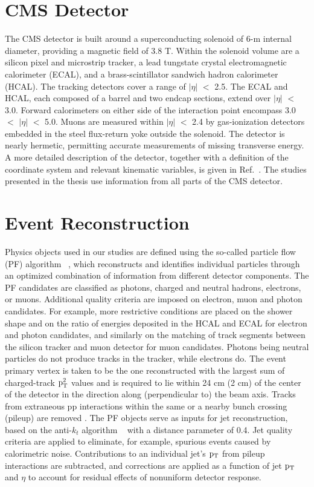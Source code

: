 \section{CMS Detector }
The CMS detector is built around a superconducting solenoid of 6-m internal diameter, providing
a magnetic field of 3.8 T. Within the solenoid volume are a silicon pixel and microstrip tracker, a
lead tungstate crystal electromagnetic calorimeter (ECAL), and a brass-scintillator sandwich hadron
calorimeter (HCAL). The tracking detectors cover a range of  $|\eta|$ $<$  2.5. The ECAL and HCAL, each composed of a barrel and two endcap sections, extend over  $|\eta|$ $<$ 3.0. Forward calorimeters on either side of the
interaction point encompass 3.0 $<$  $|\eta|$ $<$ 5.0. Muons
are measured within $|\eta|$ $<$ 2.4 by gas-ionization detectors embedded in the steel flux-return
yoke outside the solenoid. The detector is nearly hermetic, permitting accurate measurements
of missing transverse energy. A more detailed description of the detector, together with a definition of the
coordinate system and relevant kinematic variables, is given in Ref.~\cite{cms}. The studies presented in the thesis use information from all parts of the CMS detector.

\section{Event Reconstruction }
Physics objects used in our studies are defined using the so-called particle flow (PF) algorithm ~\cite{Beaudette:2014cea}, which reconstructs
and identifies individual particles through an optimized combination of information from different
detector components. The PF candidates are classified as photons, charged and
neutral hadrons, electrons, or muons. Additional quality criteria are imposed on electron,
muon and photon candidates. For example, more restrictive conditions are placed on the
shower shape and on the ratio of energies deposited in the HCAL and ECAL for electron and photon candidates,
and similarly on the matching of track segments between the silicon tracker and muon detector
for muon candidates. Photons being neutral particles do not produce tracks in the tracker, while electrons do. The event primary vertex is taken to be the one reconstructed with the
largest sum of charged-track $\rm p_{T}^{2}$ values and is required to lie within 24 cm (2 cm) of the center of
the detector in the direction along (perpendicular to) the beam axis. Tracks from extraneous
pp interactions within the same or a nearby bunch crossing (pileup) are removed .
The PF objects serve as inputs for jet reconstruction, based on the anti-$k_{t}$ algorithm ~\cite{Cacciari:2008gp}  with
a distance parameter of 0.4. Jet quality criteria are applied to eliminate,
for example, spurious events caused by calorimetric noise. Contributions to an individual jet’s
$\rm p_{T}$ from pileup interactions are subtracted, and corrections are applied as a function of jet
$\rm p_{T}$ and $\eta$ to account for residual effects of nonuniform detector response.

